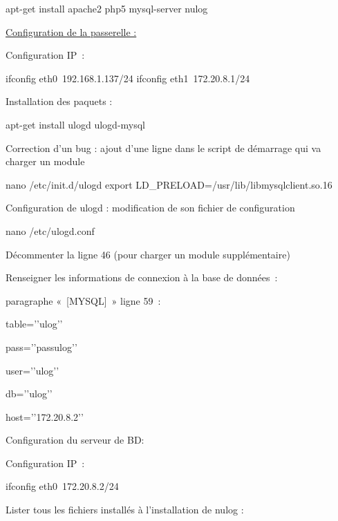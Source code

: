\documentclass[12pt]{report}
\begin{document}
\begin{itemize}
apt-get install apache2 php5 mysql-server nulog
\newline

\underline{Configuration de la passerelle :}
\newline

Configuration IP :
\newline

ifconfig eth0 192.168.1.137/24
\newline
ifconfig eth1 172.20.8.1/24
\newline

Installation des paquets :
\newline

apt-get install ulogd ulogd-mysql
\newline

Correction d'un bug : ajout d’une ligne dans le script de démarrage qui va charger un module
\newline

nano /etc/init.d/ulogd
\newline
export LD\_PRELOAD=/usr/lib/libmysqlclient.so.16
\newline

Configuration de ulogd : modification de son fichier de configuration
\newline

nano /etc/ulogd.conf
\newline

Décommenter la ligne 46 (pour charger un module supplémentaire)
\newline

Renseigner les informations de connexion à la base de données :
\newline

paragraphe « [MYSQL] » ligne 59 :

table=’’ulog’’

pass=’’passulog’’

user=’’ulog’’

db=’’ulog’’

host=’’172.20.8.2’’

\newline
Configuration du serveur de BD:
\newline

Configuration IP :

ifconfig eth0 172.20.8.2/24
\newline

Lister tous les fichiers installés à l’installation de nulog :
\newline


\end{itemize}
\end{document}
